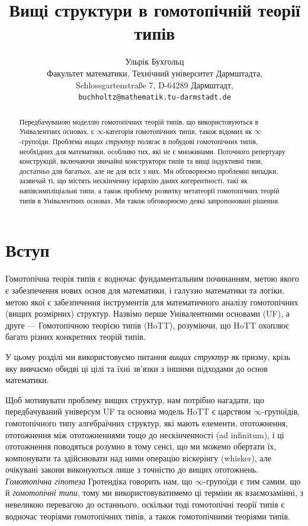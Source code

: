 \documentclass[12pt]{article}
\begin{document}
\title{Вищі структури в гомотопічній теорії типів}
\author{Ульрік Бухгольц \\ 
  \small Факультет математики, Технічний університет Дармштадта, \\
  \small Schlossgartenstra\ss e 7, D-64289 Дармштадт, \\
  \small \texttt{buchholtz@mathematik.tu-darmstadt.de}
}
\date{}

\maketitle

\begin{abstract}
Передбачуваною моделлю гомотопічних теорій типів, що використовуються в Унівалентних основах, є $\infty$-категорія гомотопічних типів, також відомих як $\infty$-групоїди. Проблема \emph{вищих структур} полягає в побудові гомотопічних типів, необхідних для математики, особливо тих, які не є множинами. Поточного репертуару конструкцій, включаючи звичайні конструктори типів та вищі індуктивні типи, достатньо для багатьох, але не для всіх з них. Ми обговорюємо проблемні випадки, зазвичай ті, що містять нескінченну ієрархію даних когерентності, такі як напівсимпліціальні типи, а також проблему розвитку метатеорії гомотопічних теорій типів в Унівалентних основах. Ми також обговорюємо деякі запропоновані рішення.
\end{abstract}

\section{Вступ}
\label{sec:introduction}

Гомотопічна теорія типів є водночас фундаментальним починанням, метою якого є забезпечення нових основ для математики, і галуззю математики та логіки, метою якої є забезпечення інструментів для математичного аналізу гомотопічних (вищих розмірних) структур. Назвімо перше Унівалентними основами (UF), а друге --- Гомотопічною теорією типів (HoTT), розуміючи, що HoTT охоплює багато різних конкретних теорій типів.

У цьому розділі ми використовуємо питання \emph{вищих структур} як призму, крізь яку вивчаємо обидві ці цілі та їхні зв'язки з іншими підходами до основ математики.

Щоб мотивувати проблему вищих структур, нам потрібно нагадати, що передбачуваний універсум UF та основна модель HoTT є царством $\infty$-групоїдів, гомотопічного типу алгебраїчних структур, які мають елементи, ототожнення, ототожнення між ототожненнями тощо до нескінченності (ad infinitum), і ці ототожнення поводяться розумно в тому сенсі, що ми можемо обертати їх, компонувати та здійснювати над ними операцію віскерінгу (whisker), але очікувані закони виконуються лише з точністю до вищих ототожнень. \emph{Гомотопічна гіпотеза} Гротендіка говорить нам, що $\infty$-групоїди є тим самим, що й \emph{гомотопічні типи}, тому ми використовуватимемо ці терміни як взаємозамінні, з невеликою перевагою до останнього, оскільки тоді гомотопічні теорії типів є водночас теоріями гомотопічних типів, а також гомотопічними теоріями типів.
\end{document}
